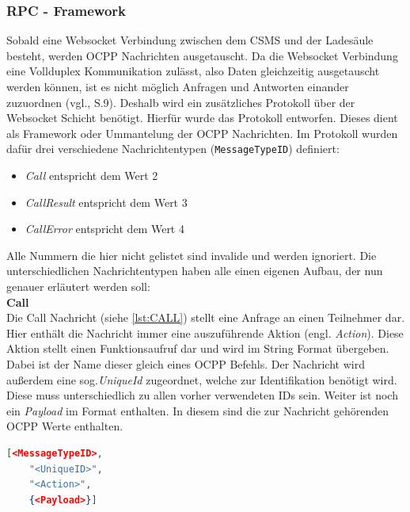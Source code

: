 \subsubsection{\ac{RPC} - Framework}
Sobald eine Websocket Verbindung zwischen dem \acs{CSMS} und  der Ladesäule besteht, werden \acs{OCPP} Nachrichten ausgetauscht. Da die Websocket Verbindung eine Vollduplex Kommunikation zulässt, also Daten gleichzeitig ausgetauscht werden können, ist es nicht möglich Anfragen und Antworten einander zuzuordnen (vgl.\cite{OCPP-2.0.1-part4-ocpp-j-specification}, S.9). Deshalb wird ein zusätzliches Protokoll über der Websocket Schicht benötigt. Hierfür wurde das  Protokoll entworfen. Dieses dient als Framework oder \glqq{}Ummantelung\grqq{} der \acs{OCPP} Nachrichten. Im Protokoll wurden dafür drei verschiedene Nachrichtentypen (\verb|MessageTypeID|) definiert:
\begin{itemize}
	\item \textit{Call} entspricht dem Wert 2
	\item \textit{CallResult}  entspricht dem Wert 3
	\item \textit{CallError}  entspricht dem Wert 4
\end{itemize}
Alle Nummern die hier nicht gelistet sind invalide und werden ignoriert.
Die unterschiedlichen Nachrichtentypen haben alle einen eigenen Aufbau, der nun genauer erläutert werden soll:\\

\noindent\textbf{Call}\\
\noindent Die Call Nachricht (siehe \autoref{lst:CALL}) stellt eine Anfrage an einen Teilnehmer dar. Hier enthält die Nachricht immer eine auszuführende Aktion (engl. \textit{Action}). Diese Aktion stellt einen Funktionsaufruf dar und wird im String Format übergeben. Dabei ist der Name dieser gleich eines \acs{OCPP} Befehls. Der Nachricht wird außerdem eine sog.\textit{UniqueId} zugeordnet, welche zur Identifikation benötigt wird. Diese muss unterschiedlich zu allen vorher verwendeten \acs{ID}s sein. Weiter ist noch ein \textit{Payload} im  Format enthalten. In diesem sind die zur Nachricht gehörenden \acs{OCPP} Werte enthalten.\\


\begin{lstlisting}[language=json, caption={Call Nachrichten Aufbau \cite{Eigene_Darstellung, OCPP-1.6-edition-2}}, label=lst:CALL, float]
	[<MessageTypeID>,
	"<UniqueID>",
	"<Action>",
	{<Payload>}]
\end{lstlisting}

